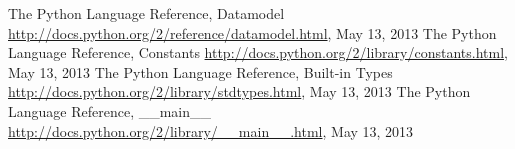 \begin{thebibliography}{8}

 The Python Language Reference, Datamodel \url{http://docs.python.org/2/reference/datamodel.html}, May 13, 2013
 The Python Language Reference, Constants \url{http://docs.python.org/2/library/constants.html}, May 13, 2013
 The Python Language Reference, Built-in Types \url{http://docs.python.org/2/library/stdtypes.html}, May 13, 2013
 The Python Language Reference, \_\_main\_\_ \url{http://docs.python.org/2/library/__main__.html}, May 13, 2013
	
\end{thebibliography}